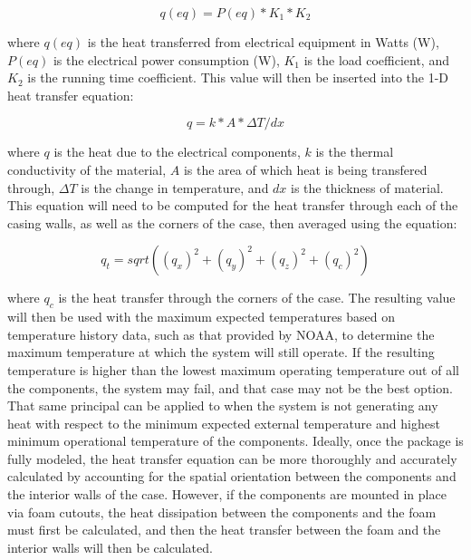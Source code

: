 $$q(eq) = P(eq)*K_1*K_2$$

where $q(eq)$ is the heat transferred from electrical equipment in Watts (W), $P(eq)$ is the electrical power consumption (W), $K_1$ is the load
coefficient, and $K_2$ is the running time coefficient.  This value will then be inserted into the 1-D heat transfer equation:

$$q=k*A*\Delta T/dx$$

where $q$ is the heat due to the electrical components, $k$ is the thermal conductivity of the material, $A$ is the area of which heat is being transfered
through, $\Delta T$ is the change in temperature, and $dx$ is the thickness of material.  This equation will need to be computed for the heat transfer
through each of the casing walls, as well as the corners of the case, then averaged using the equation:  

$$q_t = sqrt((q_x)^2+(q_y)^2+(q_z)^2+(q_c)^2)$$

where $q_c$ is the heat transfer through the corners of the case.  The resulting value will then be used with the maximum expected temperatures based on
temperature history data, such as that provided by NOAA, to determine the maximum temperature at which the system will still operate.  If the resulting
temperature is higher than the lowest maximum operating temperature out of all the components, the system may fail, and that case may not be the best
option.  That same principal can be applied to when the system is not generating any heat with respect to the minimum expected external temperature and
highest minimum operational temperature of the components.  Ideally, once the package is fully modeled, the heat transfer equation can be more
thoroughly and accurately calculated by accounting for the spatial orientation between the components and the interior walls of the case.  However,
if the components are mounted in place via foam cutouts, the heat dissipation between the components and the foam must first be calculated, and then
the heat transfer between the foam and the interior walls will then be calculated.

